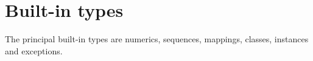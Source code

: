 \section{Built-in types}
The principal built-in types are numerics, sequences, mappings, classes, instances and exceptions.








%